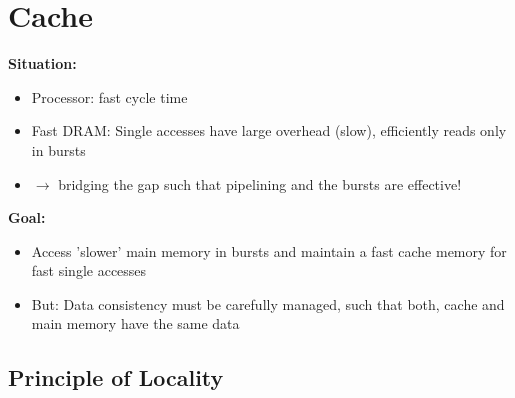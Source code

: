 \section{Cache}

\begin{remark}
    \textbf{Situation:}
    \begin{itemize}
        \item Processor: fast cycle time
        \item Fast DRAM: Single accesses have large overhead (slow), efficiently reads only in bursts
        \item $\rightarrow$ bridging the gap such that pipelining and the bursts are effective!
    \end{itemize}
\textbf{Goal:}
\begin{itemize}
    \item Access 'slower' main memory in bursts and maintain a fast cache memory for fast single accesses
    \item But: Data consistency must be carefully managed, such that both, cache and main memory have the same data
\end{itemize}
\end{remark}

\subsection{Principle of Locality}

